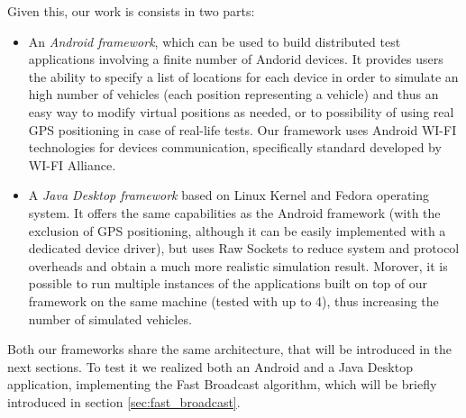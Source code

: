 Given this, our work is consists in two parts:
\begin{itemize}
	\item An \textit{Android framework}, which can be used to build distributed test applications involving a finite number of Andorid devices. It provides users the ability to specify a list of locations for each device in order to simulate an high number of vehicles (each position representing a vehicle) and thus an easy way to modify virtual positions as needed, or to possibility of using real GPS positioning in case of real-life tests. Our framework uses Android WI-FI technologies for devices communication, specifically \direct standard developed by WI-FI Alliance\textsuperscript{\texttrademark}.
	\item A \textit{Java Desktop framework} based on Linux Kernel and Fedora operating system. It offers the same capabilities as the Android framework (with the exclusion of GPS positioning, although it can be easily implemented with a dedicated device driver), but uses Raw Sockets to reduce system and protocol overheads and obtain a much more realistic simulation result. Morover, it is possible to run multiple instances of the applications built on top of our framework on the same machine (tested with up to 4), thus increasing the number of simulated vehicles.
\end{itemize}

Both our frameworks share the same architecture, that will be introduced in the next sections. To test it we realized both an Android and a Java Desktop application, implementing the Fast Broadcast algorithm, which will be briefly introduced in section \ref{sec:fast_broadcast}.

